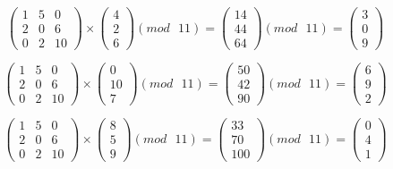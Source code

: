 \documentclass[a5paper, 10pt]{article}
\theoremstyle{definition}
\theoremstyle{plain}
\theoremstyle{remark}
\begin{document}
\begin{equation}
\begin{pmatrix}
 1 & 5 & 0\\
 2 & 0 & 6\\
0 & 2 & 10
\end{pmatrix}
 \times
\begin{pmatrix}
 4\\
2\\
6
\end{pmatrix}
(mod \text{ }11)
= 
\begin{pmatrix}
 14\\
44\\
64
\end{pmatrix}
(mod \text{ }11)
= \begin{pmatrix}
3 \\
0\\
9
\end{pmatrix}
\end{equation}

\begin{equation}
\begin{pmatrix}
 1 & 5 & 0\\
 2 & 0 & 6\\
0 & 2 & 10
\end{pmatrix}
 \times
\begin{pmatrix}
 0\\
10\\
7
\end{pmatrix}
(mod \text{ }11)
= 
\begin{pmatrix}
 50\\
42\\
90
\end{pmatrix}
(mod \text{ }11)
= \begin{pmatrix}
6 \\
9\\
2
\end{pmatrix}
\end{equation}

\begin{equation}
\begin{pmatrix}
 1 & 5 & 0\\
 2 & 0 & 6\\
0 & 2 & 10
\end{pmatrix}
 \times
\begin{pmatrix}
 8\\
5\\
9
\end{pmatrix}
(mod \text{ }11)
= 
\begin{pmatrix}
 33\\
70\\
100
\end{pmatrix}
(mod \text{ }11)
= \begin{pmatrix}
0 \\
4\\
1
\end{pmatrix}
\end{equation}
\end{document}
